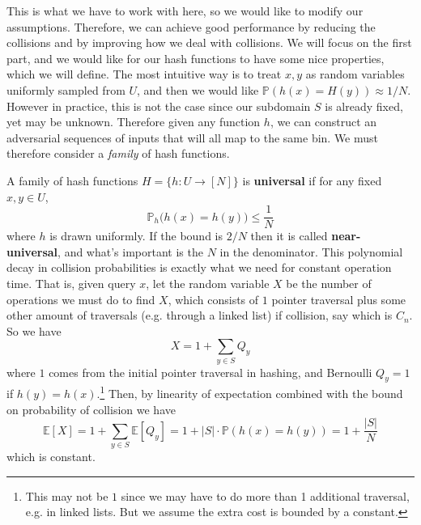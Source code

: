 \documentclass{article}
\begin{document}
    This is what we have to work with here, so we would like to modify our assumptions. Therefore, we can achieve good performance by reducing the collisions and by improving how we deal with collisions. We will focus on the first part, and we would like for our hash functions to have some nice properties, which we will define. The most intuitive way is to treat $x, y$ as random variables uniformly sampled from $U$, and then we would like $\mathbb{P}(h(x) = H(y)) \approx 1/N$. However in practice, this is not the case since our subdomain $S$ is already fixed, yet may be unknown. Therefore given any function $h$, we can construct an adversarial sequences of inputs that will all map to the same bin. We must therefore consider a \textit{family} of hash functions. 

    \begin{definition}
      A family of hash functions $H = \{h : U \rightarrow [N] \}$ is \textbf{universal} if for any fixed $x, y \in U$, 
      \begin{equation}
        \mathbb{P}_{h} \big( h(x) = h(y) \big) \leq \frac{1}{N}
      \end{equation}
      where $h$ is drawn uniformly. If the bound is $2/N$ then it is called \textbf{near-universal}, and what's important is the $N$ in the denominator. This polynomial decay in collision probabilities is exactly what we need for constant operation time. That is, given query $x$, let the random variable $X$ be the number of operations we must do to find $X$, which consists of $1$ pointer traversal plus some other amount of traversals (e.g. through a linked list) if collision, say which is $C_n$. So we have 
      \begin{equation}
        X = 1 + \sum_{y \in S} Q_y
      \end{equation}
      where $1$ comes from the initial pointer traversal in hashing, and Bernoulli $Q_y = 1$ if $h(y) = h(x)$.\footnote{This may not be $1$ since we may have to do more than 1 additional traversal, e.g. in linked lists. But we assume the extra cost is bounded by a constant.} Then, by linearity of expectation combined with the bound on probability of collision we have 
      \begin{equation}
        \mathbb{E}[X] = 1 + \sum_{y \in S} \mathbb{E}[Q_y] = 1 + |S| \cdot \mathbb{P}(h(x) = h(y)) = 1 + \frac{|S|}{N}
      \end{equation} 
      which is constant. 
    \end{definition} 
\end{document}
